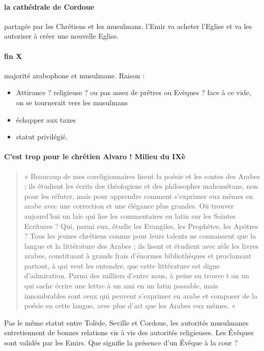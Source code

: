 \paragraph{la cathédrale de Cordoue} partagée par les Chrétiens et les musulmans. l'Emir va acheter l'Eglise et va les autoriser à créer une nouvelle Eglise. 

\paragraph{fin X} majorité arabophone et musulmane. Raison : 
\begin{itemize}
    \item Attirance ? religieuse ? ou pas assez de prêtres ou Evèques ? face à ce vide, on se tournerait vers les musulmans
    \item échapper aux taxes
    \item statut privilégié. 
\end{itemize}


\paragraph{C'est trop pour le chrétien Alvaro ! Milieu du IXè}
\begin{quote}
    «
Beaucoup de mes coreligionnaires lisent la poésie et les contes des Arabes ; ils
étudient les écrits des théologiens et des philosophes mahométans, non pour les
réfuter, mais pour apprendre comment s’exprimer eux mêmes en arabe avec une
correction et une élégance plus grandes. Où trouver aujourd’hui un laïc qui lise les
commentaires en latin sur les Saintes Ecritures ? Qui, parmi eux, étudie les Evangiles,
les Prophètes, les Apôtres ? Tous les jeunes chrétiens connus pour leurs talents ne
connaissent que la langue et la littérature des Arabes ; ils lisent et étudient avec zèle
les livres arabes, constituant à grands frais d’énormes bibliothèques et proclamant
partout, à qui veut les entendre, que cette littérature est digne d’admiration. Parmi des
milliers d’entre nous, à peine en trouve t on un qui sache écrire une lettre à un ami en
un latin passable, mais innombrables sont ceux qui peuvent s’exprimer en arabe et
composer de la poésie en cette langue, avec plus d’art que les Arabes eux mêmes. » 
\end{quote}

Pas le même statut entre Tolède, Seville et Cordoue, les autorités musulmanes entretiennent de bonnes relations vis à vis des autorités religieuses. Les Évêques sont validés par les Emirs. Que signifie la présence d'un Évêque à la cour ? 

